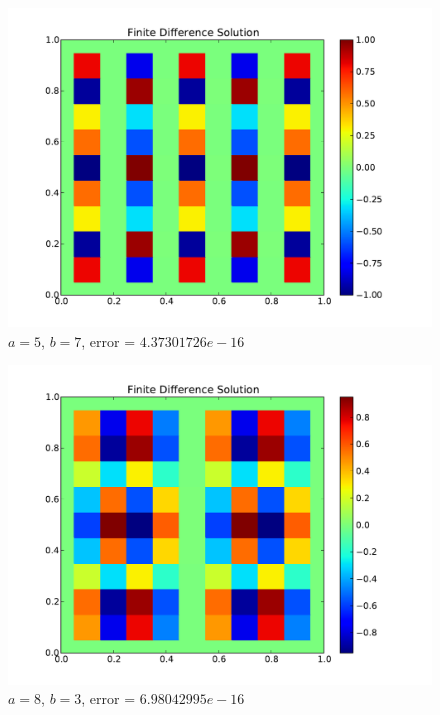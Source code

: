 \documentclass[10pt,letterpaper]{article}
\begin{document}
\begin{figure}[p]
\begin{center}
\includegraphics[width=5in,keepaspectratio]{a57.pdf}
\end{center}
\caption{$a=5$, $b=7$, error = $4.37301726e-16$}
\end{figure}

\begin{figure}[p]
\begin{center}
\includegraphics[width=5in,keepaspectratio]{a83.pdf}
\end{center}
\caption{$a=8$, $b=3$, error = $6.98042995e-16$}
\end{figure}
\end{document}
